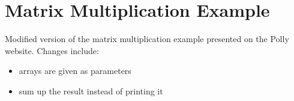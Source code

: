 
\chapter{Matrix Multiplication Example}
\label{AppendixA}

Modified version of the matrix multiplication example presented on the Polly 
website. Changes include:
\begin{itemize}
  \item arrays are given as parameters
  \item sum up the result instead of printing it
\end{itemize}

\vskip1cm

\lstset{language=C,basicstyle=\footnotesize}

